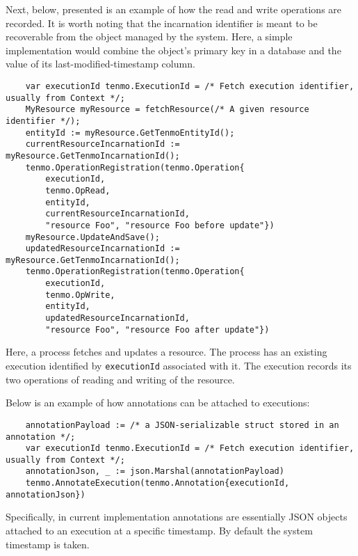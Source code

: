 Next, below, presented is an example of how the read and write operations are recorded. It is worth noting that the incarnation identifier is meant to be recoverable from the object managed by the system. Here, a simple implementation would combine the object's primary key in a database and the value of its last-modified-timestamp column.
%
\begin{verbatim}
    var executionId tenmo.ExecutionId = /* Fetch execution identifier, usually from Context */;
    MyResource myResource = fetchResource(/* A given resource identifier */);
    entityId := myResource.GetTenmoEntityId();
    currentResourceIncarnationId := myResource.GetTenmoIncarnationId();
    tenmo.OperationRegistration(tenmo.Operation{
		executionId,
		tenmo.OpRead,
		entityId,
		currentResourceIncarnationId,
		"resource Foo", "resource Foo before update"})
    myResource.UpdateAndSave();
    updatedResourceIncarnationId := myResource.GetTenmoIncarnationId();
	tenmo.OperationRegistration(tenmo.Operation{
		executionId,
		tenmo.OpWrite,
		entityId,
		updatedResourceIncarnationId,
		"resource Foo", "resource Foo after update"})
\end{verbatim}

Here, a process fetches and updates a resource. The process has an existing execution identified by \texttt{executionId} associated with it. The execution records its two operations of reading and writing of the resource.

Below is an example of how annotations can be attached to executions:
%
%
\begin{verbatim}
    annotationPayload := /* a JSON-serializable struct stored in an annotation */;
    var executionId tenmo.ExecutionId = /* Fetch execution identifier, usually from Context */;
    annotationJson, _ := json.Marshal(annotationPayload)
    tenmo.AnnotateExecution(tenmo.Annotation{executionId, annotationJson})
\end{verbatim}

Specifically, in current implementation annotations are essentially JSON objects attached to an execution at a specific timestamp. By default the system timestamp is taken.

\begin{comment}
GP: One nie są zaimplementowane, więc pomijam.
To explicitly register existence of an entity, one can:
%
\begin{verbatim}
auto tracer = tenmo::GetDefaultTracer();
tenmo::Entity entity("entity-identifier" , "Description");
tracer.RegisterEntity(&entity);
\end{verbatim}

Here,.....

To explicitly register existence of a process, one can:
%
\begin{verbatim}
auto tracer = tenmo::GetDefaultTracer();
tenmo::Process process("process-identifier" , "Description");
tracer.RegisterProcess(&process);
\end{verbatim}

TODO more examples.
\end{comment}


